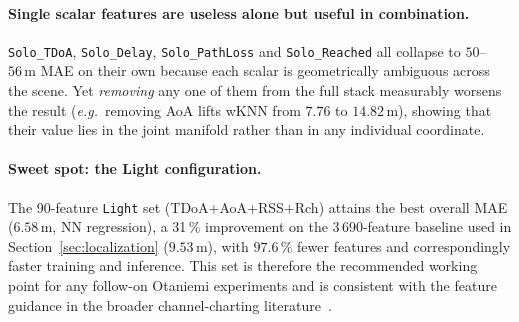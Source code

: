 \paragraph{Single scalar features are useless alone but useful in combination.}
\texttt{Solo\_TDoA}, \texttt{Solo\_Delay}, \texttt{Solo\_PathLoss} and
\texttt{Solo\_Reached} all collapse to $50$--$56\,\text{m}$ MAE on their
own because each scalar is geometrically ambiguous across the scene.
Yet \emph{removing} any one of them from the full stack measurably
worsens the result (\emph{e.g.}\ removing AoA lifts wKNN from
$7.76$ to $14.82\,\text{m}$), showing that their value lies in the
joint manifold rather than in any individual coordinate.

\paragraph{Sweet spot: the Light configuration.}
The 90-feature \texttt{Light} set (TDoA+AoA+RSS+Rch) attains the best
overall MAE ($6.58\,\text{m}$, NN regression), a 31\,\% improvement on
the 3\,690-feature baseline used in Section~\ref{sec:localization}
($9.53\,\text{m}$), with $97.6\,\%$ fewer features and correspondingly
faster training and inference.
This set is therefore the recommended working point for any follow-on
Otaniemi experiments and is consistent with the feature guidance in the
broader channel-charting literature~\cite{studer2018channel_charting}.
